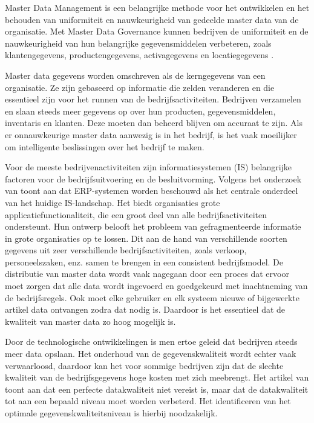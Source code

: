 Master Data Management is een belangrijke methode voor het ontwikkelen en het behouden van uniformiteit en nauwkeurigheid van gedeelde master data van de organisatie. Met Master Data Governance kunnen bedrijven de uniformiteit en de nauwkeurigheid van hun belangrijke gegevensmiddelen verbeteren, zoals klantengegevens, productengegevens, activagegevens en locatiegegevens \autocite{Foote2023}.

Master data gegevens worden omschreven als de kerngegevens van een organisatie. Ze zijn gebaseerd op informatie die zelden veranderen en die essentieel zijn voor het runnen van de bedrijfsactiviteiten. Bedrijven verzamelen en slaan steeds meer gegevens op over hun producten, gegevensmiddelen, inventaris en klanten. Deze moeten dan beheerd blijven om accuraat te zijn. Als er onnauwkeurige master data aanwezig is in het bedrijf, is het vaak moeilijker om intelligente beslissingen over het bedrijf te maken. 

Voor de meeste bedrijvenactiviteiten zijn informatiesystemen (IS) belangrijke factoren voor de bedrijfsuitvoering en de besluitvorming. Volgens het onderzoek van \textcite{Knolmayer2006} toont aan dat ERP-systemen worden beschouwd als het centrale onderdeel van het huidige IS-landschap. Het biedt organisaties grote applicatiefunctionaliteit, die een groot deel van alle bedrijfsactiviteiten ondersteunt. Hun ontwerp belooft het probleem van gefragmenteerde informatie in grote organisaties op te lossen. Dit aan de hand van verschillende soorten gegevens uit zeer verschillende bedrijfsactiviteiten, zoals verkoop, personeelszaken, enz. samen te brengen in een consistent bedrijfsmodel. De distributie van master data wordt vaak nagegaan door een proces dat ervoor moet zorgen dat alle data wordt ingevoerd en goedgekeurd met inachtneming van de bedrijfsregels. Ook moet elke gebruiker en elk systeem nieuwe of bijgewerkte artikel data ontvangen zodra dat nodig is. Daardoor is het essentieel dat de kwaliteit van master data zo hoog mogelijk is. 

Door de technologische ontwikkelingen is men ertoe geleid dat bedrijven steeds meer data opslaan. Het onderhoud van de gegevenskwaliteit wordt echter vaak verwaarloosd, daardoor kan het voor sommige bedrijven zijn dat de slechte kwaliteit van de bedrijfsgegevens hoge kosten met zich meebrengt. Het artikel van \textcite{Haug2011} toont aan dat een perfecte datakwaliteit niet vereist is, maar dat de datakwaliteit tot aan een bepaald niveau moet worden verbeterd. Het identificeren van het optimale gegevenskwaliteitsniveau is hierbij noodzakelijk.

